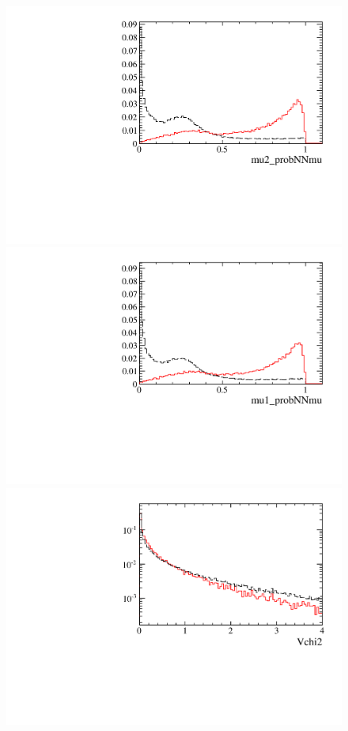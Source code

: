 \begin{figure} [htb!]
\begin{center}
\includegraphics[scale=0.20]{figs/mu2_probNNmuPARTIAL.pdf}
\includegraphics[scale=0.20]{figs/mu1_probNNmuPARTIAL.pdf}
\includegraphics[scale=0.20]{figs/Vchi2PARTIAL.pdf}

\end{center}
\end{figure}
